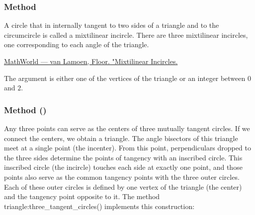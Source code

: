 \subsubsection{Method }
\label{ssub:method_triangle_mixti}

A circle that in internally tangent to two sides of a triangle and to the circumcircle is called a mixtilinear incircle. There are three mixtilinear incircles, one corresponding to each angle of the triangle.
\begin{flushright}
\small
\href{https://mathworld.wolfram.com/MixtilinearIncircles.html}{MathWorld — van Lamoen, Floor. "Mixtilinear Incircles.}
\end{flushright}

The argument is either one of the vertices of the triangle or an integer between $0$
 and $2$.

\begin{tkzexample}[latex=.52\textwidth]
\end{tkzexample}

\subsubsection{Method ()}
\label{ssub:method_triangle_three_tgt_c}

Any three points can serve as the centers of three mutually tangent circles. If we connect the centers, we obtain a triangle. The angle bisectors of this triangle meet at a single point (the incenter). From this point, perpendiculars dropped to the three sides determine the points of tangency with an inscribed circle.
This inscribed circle (the incircle) touches each side at exactly one point, and those points also serve as the common tangency points with the three outer circles. Each of these outer circles is defined by one vertex of the triangle (the center) and the tangency point opposite to it.
The method triangle:three\_tangent\_circles() implements this construction:


